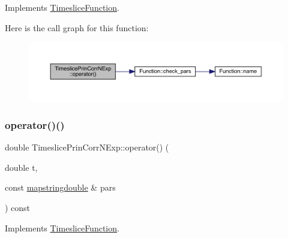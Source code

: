 Implements \mbox{\hyperlink{classTimesliceFunction_ac4426035b36872933c70b5e0ad8cb4e3}{Timeslice\+Function}}.

Here is the call graph for this function\+:
\nopagebreak
\begin{figure}[H]
\begin{center}
\leavevmode
\includegraphics[width=350pt]{d8/df8/classTimeslicePrinCorrNExp_a9a55af8256beba8993e5163bdab55571_cgraph}
\end{center}
\end{figure}
\mbox{\label{classTimeslicePrinCorrNExp_a3e258d5590d272f3f3dc735dd84c6702}} 
\subsubsection{\texorpdfstring{operator()()}{operator()()}\hspace{0.1cm}{\footnotesize\ttfamily [3/4]}}
{\footnotesize\ttfamily double Timeslice\+Prin\+Corr\+N\+Exp\+::operator() (\begin{DoxyParamCaption}\item[{double}]{t,  }\item[{const \mbox{\hyperlink{lib_2fitting__lib_2includes_8h_a647b481c557c7966517f753340a81d13}{mapstringdouble}} \&}]{pars }\end{DoxyParamCaption}) const\hspace{0.3cm}{\ttfamily [virtual]}}



Implements \mbox{\hyperlink{classTimesliceFunction_a0a71b38a0008247e9ed3726b466132c3}{Timeslice\+Function}}.

\mbox{\label{classTimeslicePrinCorrNExp_a3e258d5590d272f3f3dc735dd84c6702}} 

